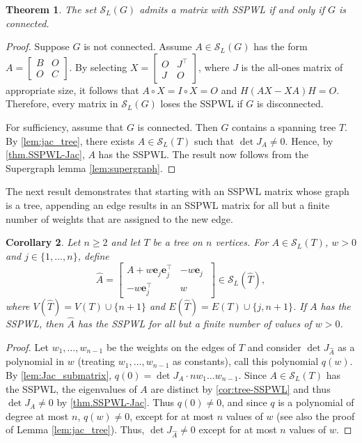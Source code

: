 \documentclass{article}
\newtheorem{theorem}{Theorem}[section]
\newtheorem{corollary}[theorem]{Corollary}
\theoremstyle{definition}
\newcommand{\trans}{^\top}
\newcommand{\mptn}{\mathcal{S}}
\begin{document}
\begin{theorem}
    \label{thm:}
   The set  $\mptn_L(G)$ admits a  matrix with SSPWL if and only if $G$ is connected.
\end{theorem}

\begin{proof}
Suppose $G$ is not connected.  Assume $A\in\mptn_L(G)$ has the form $A = \begin{bmatrix}
    B & O \\O & C
\end{bmatrix}$.  By selecting $X = \begin{bmatrix} O & J\trans \\ J & O \end{bmatrix}$, where $J$ is the all-ones matrix of appropriate size, it follows that $A\circ X = I\circ X = O$ and $H(AX - XA)H = O$.  Therefore, every matrix in $\mptn_L(G)$ loses the SSPWL if $G$ is disconnected.

For sufficiency, assume that $G$ is connected. Then $G$ contains a spanning tree $T$. By \cref{lem:jac_tree}, there exists $A \in \mptn_L(T)$ such that $\det J_A \neq 0$. Hence, by \cref{thm.SSPWL-Jac}, $A$ has the SSPWL. The result now follows from the Supergraph lemma \cref{lem:supergraph}. 
\end{proof}

The next result demonstrates that starting with an SSPWL matrix whose graph is a tree, appending an edge results in an SSPWL matrix  for all but a finite number of weights that are assigned to the new edge. 

\begin{corollary}   
Let $n \geq 2$ and let $T$ be a tree on $n$ vertices. For $A \in \mptn_L(T)$, $w > 0$ and $j \in \{1, \dots, n\}$, define
    \[
    \widehat{A} =  \left[\begin{array}{c|c}
A + w\mathbf{e}_j\mathbf{e}_j\trans & -w\mathbf{e}_j\ \\ \hline
-w\mathbf{e}_j\trans & w
\end{array}
\right] \in \mptn_L(\widehat{T}),
    \]
    where $V(\widehat{T}) = V(T) \cup \{n+1\}$ and $E(\widehat{T}) = E(T) \cup \{j, n+1\}$. If $A$ has the SSPWL, then  $\widehat{A}$ has the SSPWL  for all but a finite number of values of $w >0$.
    \end{corollary}


\begin{proof}
Let $w_1, \dots, w_{n-1}$ be the weights on the edges of $T$ and consider $\det J_{\widehat{A}}$ as a polynomial in $w$ (treating $w_1, \dots, w_{n-1}$ as constants), call this polynomial $q(w)$. By \cref{lem:Jac_submatrix}, $q(0) = \det J_A \cdot nw_1\dots w_{n-1}$. Since $A \in \mptn_L(T)$ has the SSPWL, the eigenvalues of $A$ are distinct by \cref{cor:tree-SSPWL} and thus  $\det J_A \neq 0$ by \cref{thm.SSPWL-Jac}. Thus $q(0) \neq 0$,  and since $q$ is a  polynomial of degree at most $n$, $q(w) \neq 0$, except for at most $n$ values of $w$ (see also the proof of Lemma \ref{lem:jac_tree}). Thus, $\det J_{\widehat{A}} \neq 0$ except for at most $n$ values of $w$.
\end{proof}
\end{document}
